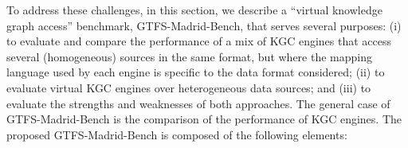 To address these challenges, in this section, we describe a ``virtual knowledge graph access'' benchmark, GTFS-Madrid-Bench, that serves several purposes: (i) to evaluate and compare the performance of a mix of KGC engines that access several (homogeneous) sources in the same format, but where the mapping language used by each engine is specific to the data format considered; (ii) to evaluate virtual KGC engines over heterogeneous data sources; and (iii) to evaluate the strengths and weaknesses of both approaches. The general case of GTFS-Madrid-Bench is the comparison of the performance of KGC engines. The proposed GTFS-Madrid-Bench is composed of the following elements:


